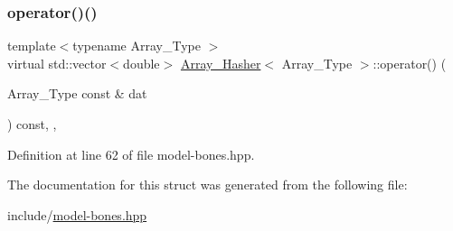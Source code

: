 \subsubsection{\texorpdfstring{operator()()}{operator()()}}
{\footnotesize\ttfamily template$<$typename Array\+\_\+\+Type $>$ \\
virtual std\+::vector$<$double$>$ \hyperlink{struct_array___hasher}{Array\+\_\+\+Hasher}$<$ Array\+\_\+\+Type $>$\+::operator() (\begin{DoxyParamCaption}\item[{Array\+\_\+\+Type const \&}]{dat }\end{DoxyParamCaption}) const\hspace{0.3cm}{\ttfamily [inline]}, {\ttfamily [virtual]}, {\ttfamily [noexcept]}}



Definition at line 62 of file model-\/bones.\+hpp.



The documentation for this struct was generated from the following file\+:\begin{DoxyCompactItemize}
\item 
include/\hyperlink{model-bones_8hpp}{model-\/bones.\+hpp}\end{DoxyCompactItemize}

